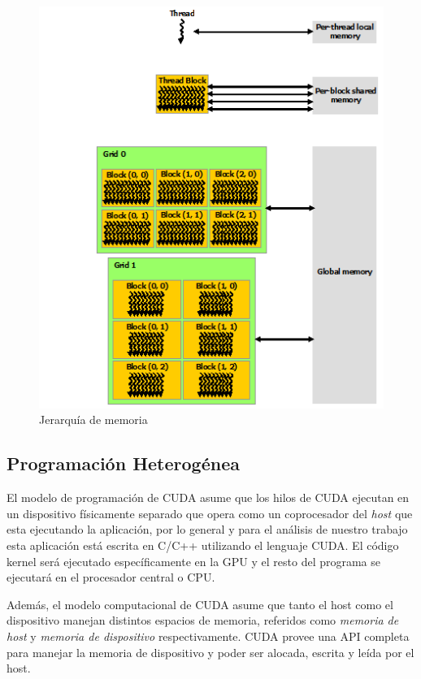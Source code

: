 \documentclass[a4paper,openright,12pt, oneside]{book}
\begin{document}
\begin{figure}[!htbp]
  \begin{center}
    \leavevmode

    \includegraphics[]{memory-hierarchy.png}

    \caption{Jerarqu\'ia de memoria}
    \label{CUDA3}
  \end{center}
\end{figure}


\subsection*{Programaci\'on Heterog\'enea}

El modelo de programaci\'on de CUDA asume que los hilos de CUDA ejecutan en un dispositivo
f\'isicamente separado que opera como un coprocesador del \textit{host} que esta ejecutando
la aplicaci\'on, por lo general y para el an\'alisis de nuestro trabajo esta aplicaci\'on 
est\'a escrita en C/C++ utilizando el lenguaje CUDA. El c\'odigo kernel ser\'a ejecutado
espec\'ificamente en la GPU y el resto del programa se ejecutar\'a en el procesador
central o CPU.

Adem\'as, el modelo computacional de CUDA asume que tanto el host como el dispositivo
manejan distintos espacios de memoria, referidos como \textit{memoria de host}
y \textit{memoria de dispositivo} respectivamente. CUDA provee una API completa
para manejar la memoria de dispositivo y poder ser alocada, escrita y le\'ida por 
el host.
\end{document}
